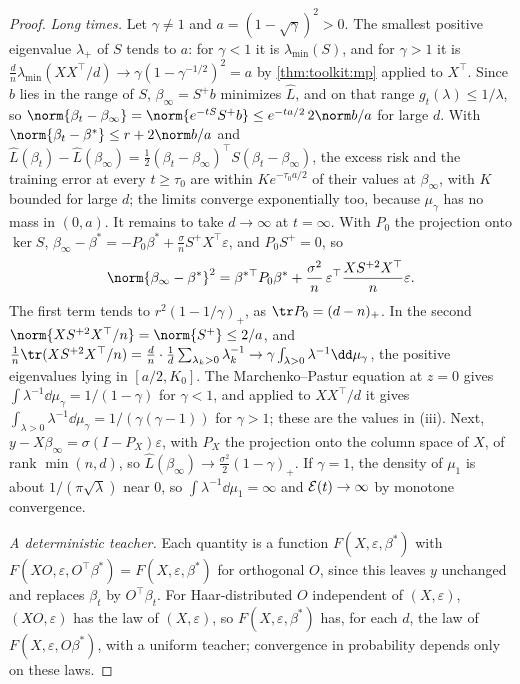 \begin{refsection}
\begin{proof}
\emph{Long times.} Let $\gamma\ne1$ and $a=(1-\sqrt\gamma)^2>0$. The smallest positive eigenvalue $\lambda_+$ of $S$ tends to $a$: for $\gamma<1$ it is $\lambda_{\min}(S)$, and for $\gamma>1$ it is $\frac dn\lambda_{\min}(XX^\top/d)\to\gamma(1-\gamma^{-1/2})^2=a$ by \cref{thm:toolkit:mp} applied to $X^\top$. Since $b$ lies in the range of $S$, $\beta_\infty=S^+b$ minimizes $\hat L$, and on that range $g_t(\lambda)\le1/\lambda$, so $\norm{\beta_t-\beta_\infty}=\norm{e^{-tS}S^+b}\le e^{-ta/2}\,2\norm b/a$ for large $d$. With $\norm{\beta_t-\beta^*}\le r+2\norm b/a$ and $\hat L(\beta_t)-\hat L(\beta_\infty)=\frac12(\beta_t-\beta_\infty)^\top S(\beta_t-\beta_\infty)$, the excess risk and the training error at every $t\ge\tau_0$ are within $Ke^{-\tau_0a/2}$ of their values at $\beta_\infty$, with $K$ bounded for large $d$; the limits converge exponentially too, because $\mu_\gamma$ has no mass in $(0,a)$. It remains to take $d\to\infty$ at $t=\infty$. With $P_0$ the projection onto $\ker S$, $\beta_\infty-\beta^*=-P_0\beta^*+\frac\sigma nS^+X^\top\varepsilon$, and $P_0S^+=0$, so
\[
\norm{\beta_\infty-\beta^*}^2=\beta^{*\top}P_0\beta^*+\frac{\sigma^2}n\,\varepsilon^\top\frac{XS^{+2}X^\top}n\varepsilon.
\]
The first term tends to $r^2(1-1/\gamma)_+$, as $\tr P_0=(d-n)_+$. In the second $\norm{XS^{+2}X^\top/n}=\norm{S^+}\le2/a$, and $\frac1n\tr(XS^{+2}X^\top/n)=\frac dn\cdot\frac1d\sum_{\lambda_k>0}\lambda_k^{-1}\to\gamma\int_{\lambda>0}\lambda^{-1}\dd\mu_\gamma$, the positive eigenvalues lying in $[a/2,K_0]$. The Marchenko--Pastur equation at $z=0$ gives $\int\lambda^{-1}\dd\mu_\gamma=1/(1-\gamma)$ for $\gamma<1$, and applied to $XX^\top/d$ it gives $\int_{\lambda>0}\lambda^{-1}\dd\mu_\gamma=1/(\gamma(\gamma-1))$ for $\gamma>1$; these are the values in (iii). Next, $y-X\beta_\infty=\sigma(I-P_X)\varepsilon$, with $P_X$ the projection onto the column space of $X$, of rank $\min(n,d)$, so $\hat L(\beta_\infty)\to\frac{\sigma^2}2(1-\gamma)_+$. If $\gamma=1$, the density of $\mu_1$ is about $1/(\pi\sqrt\lambda)$ near $0$, so $\int\lambda^{-1}\dd\mu_1=\infty$ and $\mathcal{E}(t)\to\infty$ by monotone convergence.

\emph{A deterministic teacher.} Each quantity is a function $F(X,\varepsilon,\beta^*)$ with $F(XO,\varepsilon,O^\top\beta^*)=F(X,\varepsilon,\beta^*)$ for orthogonal $O$, since this leaves $y$ unchanged and replaces $\beta_t$ by $O^\top\beta_t$. For Haar-distributed $O$ independent of $(X,\varepsilon)$, $(XO,\varepsilon)$ has the law of $(X,\varepsilon)$, so $F(X,\varepsilon,\beta^*)$ has, for each $d$, the law of $F(X,\varepsilon,O\beta^*)$, with a uniform teacher; convergence in probability depends only on these laws.
\end{proof}


\end{refsection}
